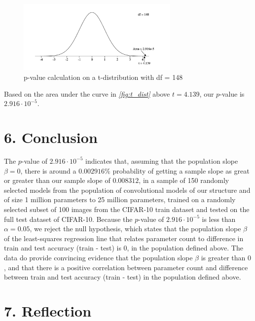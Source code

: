 \documentclass[12pt]{article}
\begin{document}
    \begin{figure}[H]
        \centering
        \includegraphics[width=0.7\textwidth]{Images/tdistribution}
        \caption{p-value calculation on a t-distribution with df = 148}
        \label{fig:t_dist}
    \end{figure}

    \noindent Based on the area under the curve in \textit{\autoref{fig:t_dist}} above $t=4.139$, our $p$-value is $2.916\cdot10^{-5}$.

    \section*{6. Conclusion}

    The $p$-value of $2.916\cdot10^{-5}$ indicates that, assuming that the population slope $\beta=0$, there is around a
    $0.002916\%$ probability of getting a sample slope as great or greater than our sample slope of $0.008312$, in a sample of
    150 randomly selected models from the population of convolutional models of our structure and of size 1 million parameters to 25 million parameters, trained
    on a randomly selected subset of 100 images from the CIFAR-10 train dataset and tested on the full test dataset of CIFAR-10.
    Because the $p$-value of $2.916\cdot10^{-5}$ is less than $\alpha=0.05$, we reject the null hypothesis, which states that the population slope $\beta$
    of the least-squares regression line that relates parameter count to difference in train and test accuracy (train - test) is $0$,
    in the population defined above.
    The data do provide convincing evidence that the population slope $\beta$ is greater than $0$, and that there is a positive correlation between
    parameter count and difference between train and test accuracy (train - test) in the population defined above.


    \section*{7. Reflection}
\end{document}
